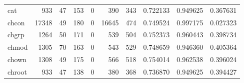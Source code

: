 \begin{longtable}{lrrrrrrrrr}
cat       &                                 933 &                                              47 &                                            153 &                                             0 &                                            390 &                                          343 &                                           0.722133 &                               0.949625 &                             0.367631 \\
chcon     &                               17348 &                                              49 &                                            180 &                                             0 &                                          16645 &                                          474 &                                           0.749524 &                               0.997175 &                             0.027323 \\
chgrp     &                                1264 &                                              50 &                                            171 &                                             0 &                                            539 &                                          504 &                                           0.752373 &                               0.960443 &                             0.398734 \\
chmod     &                                1305 &                                              70 &                                            163 &                                             0 &                                            543 &                                          529 &                                           0.748659 &                               0.946360 &                             0.405364 \\
chown     &                                1308 &                                              49 &                                            175 &                                             0 &                                            566 &                                          518 &                                           0.754014 &                               0.962538 &                             0.396024 \\
chroot    &                                 933 &                                              47 &                                            138 &                                             0 &                                            380 &                                          368 &                                           0.736870 &                               0.949625 &                             0.394427 \\

\end{longtable}
